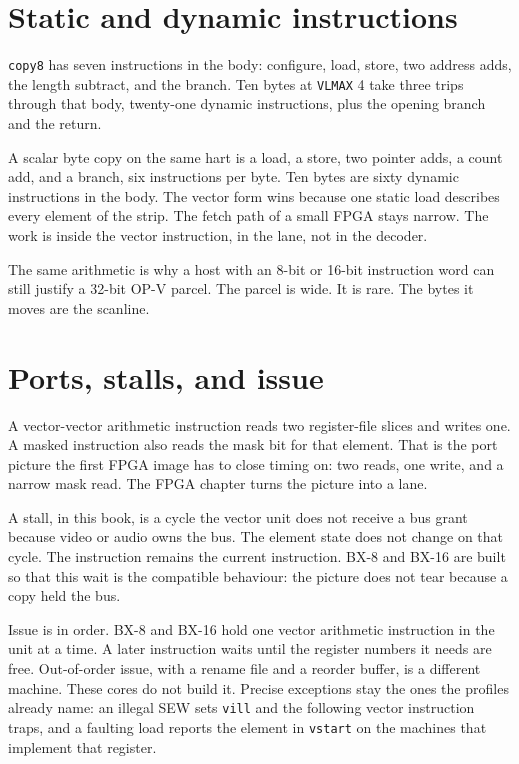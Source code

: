 \section{Static and dynamic instructions}

\texttt{copy8} has seven instructions in the body: configure, load, store, two address adds, the length subtract, and the branch. Ten bytes at \texttt{VLMAX} 4 take three trips through that body, twenty-one dynamic instructions, plus the opening branch and the return.

A scalar byte copy on the same hart is a load, a store, two pointer adds, a count add, and a branch, six instructions per byte. Ten bytes are sixty dynamic instructions in the body. The vector form wins because one static load describes every element of the strip. The fetch path of a small FPGA stays narrow. The work is inside the vector instruction, in the lane, not in the decoder.

The same arithmetic is why a host with an 8-bit or 16-bit instruction word can still justify a 32-bit OP-V parcel. The parcel is wide. It is rare. The bytes it moves are the scanline.

\section{Ports, stalls, and issue}

A vector-vector arithmetic instruction reads two register-file slices and writes one. A masked instruction also reads the mask bit for that element. That is the port picture the first FPGA image has to close timing on: two reads, one write, and a narrow mask read. The FPGA chapter turns the picture into a lane.

A stall, in this book, is a cycle the vector unit does not receive a bus grant because video or audio owns the bus. The element state does not change on that cycle. The instruction remains the current instruction. BX-8 and BX-16 are built so that this wait is the compatible behaviour: the picture does not tear because a copy held the bus.

Issue is in order. BX-8 and BX-16 hold one vector arithmetic instruction in the unit at a time. A later instruction waits until the register numbers it needs are free. Out-of-order issue, with a rename file and a reorder buffer, is a different machine. These cores do not build it. Precise exceptions stay the ones the profiles already name: an illegal SEW sets \texttt{vill} and the following vector instruction traps, and a faulting load reports the element in \texttt{vstart} on the machines that implement that register.

